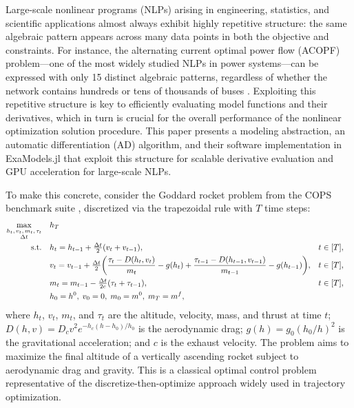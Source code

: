 \documentclass[11pt]{article}
\begin{document}
Large-scale nonlinear programs (NLPs) arising in engineering, statistics, and scientific applications almost always exhibit highly repetitive structure: the same algebraic pattern appears across many data points in both the objective and constraints.
For instance, the alternating current optimal power flow (ACOPF) problem---one of the most widely studied NLPs in power systems---can be expressed with only 15 distinct algebraic patterns, regardless of whether the network contains hundreds or tens of thousands of buses \citep{shinAcceleratingOptimalPower2024}. Exploiting this repetitive structure is key to efficiently evaluating model functions and their derivatives, which in turn is crucial for the overall performance of the nonlinear optimization solution procedure. This paper presents a modeling abstraction, an automatic differentiation (AD) algorithm, and their software implementation in ExaModels.jl that exploit this structure for scalable derivative evaluation and GPU acceleration for large-scale NLPs.

To make this concrete, consider the Goddard rocket problem \citep{goddardMethodReachingExtreme1919} from the COPS benchmark suite \citep{dolanBenchmarkingOptimizationSoftware2001}, discretized via the trapezoidal rule with $T$ time steps:
\begin{subequations}\label{eq:rocket}
\begin{align}
  \max_{\substack{h_t,\, v_t,\, m_t,\, \tau_t \\ \Delta t}} \quad
  & h_T \\
  \mathop{\text{\normalfont s.t.}} \quad
  & h_t = h_{t-1} + \tfrac{\Delta t}{2}(v_t + v_{t-1}), & t &\in [T], \label{eq:rocket:h}\\
  & v_t = v_{t-1} + \tfrac{\Delta t}{2}\!\left(\frac{\tau_t - D(h_t,v_t)}{m_t} - g(h_t) + \frac{\tau_{t-1} - D(h_{t-1},v_{t-1})}{m_{t-1}} - g(h_{t-1})\right)\!, & t &\in [T], \label{eq:rocket:v}\\
  & m_t = m_{t-1} - \tfrac{\Delta t}{2c}(\tau_t + \tau_{t-1}), & t &\in [T], \label{eq:rocket:m}\\
  & h_0 = h^0,\; v_0 = 0,\; m_0 = m^0,\; m_T = m^f,
\end{align}
\end{subequations}
where $h_t$, $v_t$, $m_t$, and $\tau_t$ are the altitude, velocity, mass, and thrust at time $t$; $D(h,v) = D_c v^2 e^{-h_c(h - h_0)/h_0}$ is the aerodynamic drag; $g(h) = g_0 (h_0/h)^2$ is the gravitational acceleration; and $c$ is the exhaust velocity. The problem aims to maximize the final altitude of a vertically ascending rocket subject to aerodynamic drag and gravity. This is a classical optimal control problem representative of the discretize-then-optimize approach widely used in trajectory optimization.
\end{document}
